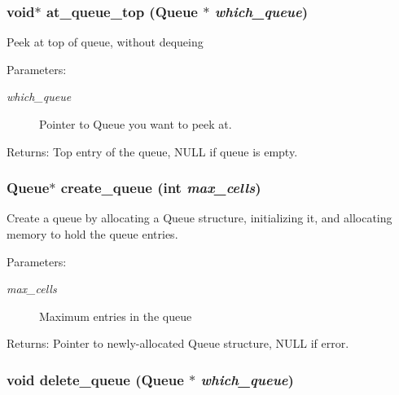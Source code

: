 \subsubsection{\setlength{\rightskip}{0pt plus 5cm}void$\ast$ at\_\-queue\_\-top (\bf{Queue} $\ast$ {\em which\_\-queue})}\label{queue_8h_70ca1dde791d8b919984ca5c98da8ade}


Peek at top of queue, without dequeing \begin{Desc}
\item[Parameters:]
\begin{description}
\item[{\em which\_\-queue}]Pointer to Queue you want to peek at. \end{description}
\end{Desc}
\begin{Desc}
\item[Returns:]Top entry of the queue, NULL if queue is empty. \end{Desc}
\subsubsection{\setlength{\rightskip}{0pt plus 5cm}\bf{Queue}$\ast$ create\_\-queue (int {\em max\_\-cells})}\label{queue_8h_b710f6637419a761df20688da7ece206}


Create a queue by allocating a Queue structure, initializing it, and allocating memory to hold the queue entries. \begin{Desc}
\item[Parameters:]
\begin{description}
\item[{\em max\_\-cells}]Maximum entries in the queue \end{description}
\end{Desc}
\begin{Desc}
\item[Returns:]Pointer to newly-allocated Queue structure, NULL if error. \end{Desc}
\subsubsection{\setlength{\rightskip}{0pt plus 5cm}void delete\_\-queue (\bf{Queue} $\ast$ {\em which\_\-queue})}\label{queue_8h_59e6e61741ed251ed46a6a38990c24b0}


